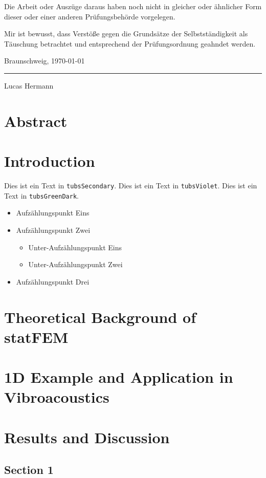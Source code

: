 \documentclass[german=false,thesistype=master,nolistoftables,noabstract]{tubsthesis}
\begin{document}
Die Arbeit oder Auszüge daraus haben noch nicht in gleicher oder ähnlicher Form dieser
oder einer anderen Prüfungsbehörde vorgelegen.

Mir ist bewusst, dass Verstöße gegen die Grundsätze der Selbstständigkeit als Täuschung
betrachtet und entsprechend der Prüfungsordnung geahndet werden.

\begin{flushright}
Braunschweig, \today
\end{flushright}

\vspace{2cm}
\hspace{2cm}\rule{5cm}{1pt}

\hspace{2cm}\small{Lucas Hermann} 

\chapter*{Abstract}
\lipsum[1]

\tableofcontents


\chapter{Introduction}

\textcolor{tubsSecondary}{Dies ist ein Text in \texttt{tubsSecondary}.}
\textcolor{tubsViolet}{Dies ist ein Text in \texttt{tubsViolet}.}
\textcolor{tubsGreenDark}{Dies ist ein Text in \texttt{tubsGreenDark}.}\bigskip

\lipsum[1]

\begin{itemize}
  \item Aufzählungspunkt Eins
  \item Aufzählungspunkt Zwei
    \begin{itemize}
      \item Unter-Aufzählungspunkt Eins
      \item Unter-Aufzählungspunkt Zwei
    \end{itemize}
  \item Aufzählungspunkt Drei
\end{itemize}

\chapter{Theoretical Background of statFEM}

\lipsum[2-5] %

\chapter{1D Example and Application in Vibroacoustics}

\lipsum[2-5] %



\chapter{Results and Discussion}

\lipsum[1-3] %

\section{Section 1}

\lipsum[4-7] %
\end{document}
